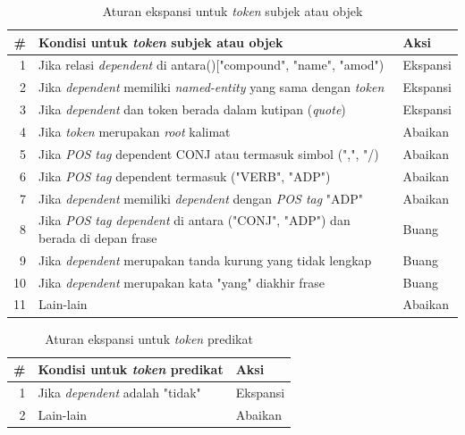 \begin{table}
\caption{Aturan ekspansi untuk \textit{token} subjek atau objek}
\label{tab:token_expansion_rules_s_o}
\centering
\begin{tabular}{r p{10cm} l}
\hline
\textbf{\#} & \textbf{Kondisi untuk \textit{token} subjek atau objek} & \textbf{Aksi} \\
\hline
1 & Jika relasi \textit{dependent} di antara()["compound", "name", "amod") & Ekspansi \\
2 & Jika \textit{dependent} memiliki \textit{named-entity} yang sama dengan \textit{token}  & Ekspansi \\
3 & Jika \textit{dependent} dan token berada dalam kutipan (\textit{quote}) & Ekspansi \\
4 & Jika \textit{token} merupakan \textit{root} kalimat & Abaikan \\
5 & Jika \textit{POS tag} dependent CONJ atau termasuk simbol (",", "/) & Abaikan \\
6 & Jika \textit{POS tag} dependent termasuk ("VERB", "ADP")  & Abaikan \\
7 & Jika \textit{dependent} memiliki \textit{dependent} dengan \textit{POS tag} "ADP" & Abaikan \\
8 & Jika \textit{POS tag} \textit{dependent} di antara ("CONJ", "ADP") dan berada di depan frase & Buang \\
9 & Jika \textit{dependent} merupakan tanda kurung yang tidak lengkap & Buang \\
10 & Jika \textit{dependent} merupakan kata "yang" diakhir frase & Buang \\
11 & Lain-lain & Abaikan \\
\hline
\end{tabular}
\end{table}

\begin{table}
\caption{Aturan ekspansi untuk \textit{token} predikat}
\label{tab:token_expansion_rules_p}
\centering
\begin{tabular}{r p{10cm} l}
\hline
\textbf{\#} & \textbf{Kondisi untuk \textit{token} predikat} & \textbf{Aksi} \\
\hline
1 & Jika \textit{dependent} adalah "tidak" & Ekspansi \\
2 & Lain-lain & Abaikan \\
\hline
\end{tabular}
\end{table}

